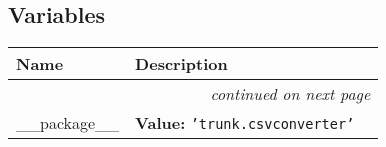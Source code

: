 
  \subsection{Variables}

    \vspace{-1cm}
\hspace{\varindent}\begin{longtable}{|p{\varnamewidth}|p{\vardescrwidth}|l}
\cline{1-2}
\cline{1-2} \centering \textbf{Name} & \centering \textbf{Description}& \\
\cline{1-2}
\endhead\cline{1-2}\multicolumn{3}{r}{\small\textit{continued on next page}}\\\endfoot\cline{1-2}
\endlastfoot\raggedright \_\-\_\-p\-a\-c\-k\-a\-g\-e\-\_\-\_\- & \raggedright \textbf{Value:} 
{\tt \texttt{'}\texttt{trunk.csvconverter}\texttt{'}}&\\
\cline{1-2}
\end{longtable}

